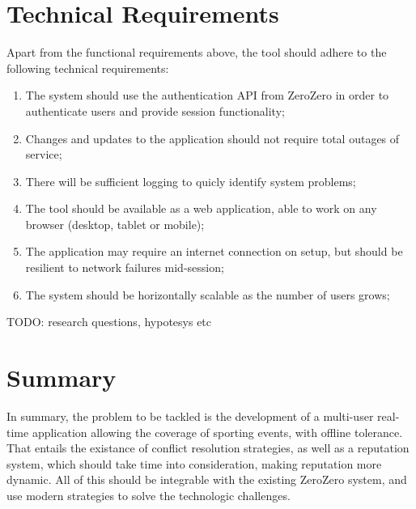 \section{Technical Requirements}

Apart from the functional requirements above, the tool should adhere to the following technical requirements:

\begin{enumerate}[leftmargin  = 3.25\parindent, align=left, label=TR\arabic*, start=1]
    \item The system should use the authentication API from ZeroZero in order to authenticate users and provide session functionality;
    \item Changes and updates to the application should not require total outages of service;
    \item There will be sufficient logging to quicly identify system problems;
    \item The tool should be available as a web application, able to work on any browser (desktop, tablet or mobile);
    \item The application may require an internet connection on setup, but should be resilient to network failures mid-session;
    \item The system should be horizontally scalable as the number of users grows;
\end{enumerate}

{\Huge TODO: research questions, hypotesys etc}

\section{Summary}

In summary, the problem to be tackled is the development of a multi-user real-time application allowing the coverage of sporting events, with offline tolerance. That entails the existance of conflict resolution strategies, as well as a reputation system, which should take time into consideration, making reputation more dynamic. All of this should be integrable with the existing ZeroZero system, and use modern strategies to solve the technologic challenges.

